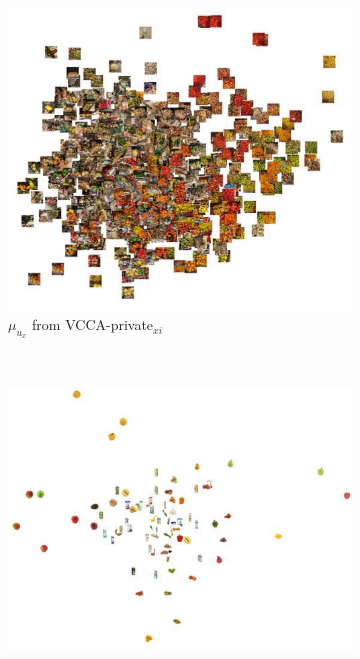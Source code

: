\begin{figure}[th!]
\begin{minipage}{\textwidth}
\begin{subfigure}[t]{0.48\textwidth}
		\end{subfigure}
	\end{minipage}
	\begin{minipage}{0.8\textwidth}
		\centering
		\begin{subfigure}[t]{0.6\textwidth}
			\centering
			\includegraphics[width=\textwidth]{PaperB/appendix/figures/vcca_private_xi/vcca_private_xi_ux_space.pdf}
			\caption{$\mu_{u_{x}}$ from VCCA-private$_{x i}$}
			\label{fig:pca_vcca_private_xi_ux}
		\end{subfigure} \\
		\begin{subfigure}[t]{0.75\textwidth}
			\centering
			\includegraphics[width=\textwidth]{PaperB/appendix/figures/vcca_private_xi/vcca_private_xi_ui_space.pdf}

\end{subfigure}
\end{minipage}
\end{figure}
